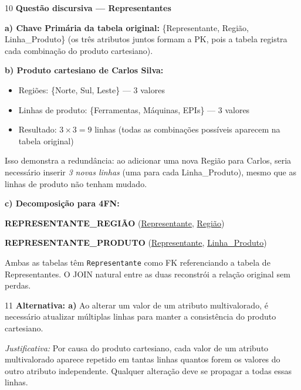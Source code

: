 \documentclass[12pt]{article}
\begin{document}
\vspace{0.5cm}

\begin{gabbox}{10}
\textbf{Questão discursiva — Representantes}
\end{gabbox}

\begin{respdisc}
\textbf{a) Chave Primária da tabela original:} \{Representante, Região, Linha\_Produto\} (os três atributos juntos formam a PK, pois a tabela registra cada combinação do produto cartesiano).

\medskip
\textbf{b) Produto cartesiano de Carlos Silva:}
\begin{itemize}
  \item Regiões: \{Norte, Sul, Leste\} — 3 valores
  \item Linhas de produto: \{Ferramentas, Máquinas, EPIs\} — 3 valores
  \item Resultado: $3 \times 3 = 9$ linhas (todas as combinações possíveis aparecem na tabela original)
\end{itemize}
Isso demonstra a redundância: ao adicionar uma nova Região para Carlos, seria necessário inserir \emph{3 novas linhas} (uma para cada Linha\_Produto), mesmo que as linhas de produto não tenham mudado.

\medskip
\textbf{c) Decomposição para 4FN:}

\medskip
\textbf{REPRESENTANTE\_REGIÃO} (\underline{Representante}, \underline{Região})

\medskip
\textbf{REPRESENTANTE\_PRODUTO} (\underline{Representante}, \underline{Linha\_Produto})

\medskip
Ambas as tabelas têm \texttt{Representante} como FK referenciando a tabela de Representantes. O JOIN natural entre as duas reconstrói a relação original sem perdas.
\end{respdisc}

\vspace{0.5cm}

\begin{gabbox}{11}
\textbf{Alternativa: a)} Ao alterar um valor de um atributo multivalorado, é necessário atualizar múltiplas linhas para manter a consistência do produto cartesiano.

\smallskip
\textit{Justificativa:} Por causa do produto cartesiano, cada valor de um atributo multivalorado aparece repetido em tantas linhas quantos forem os valores do outro atributo independente. Qualquer alteração deve se propagar a todas essas linhas.
\end{gabbox}
\end{document}
